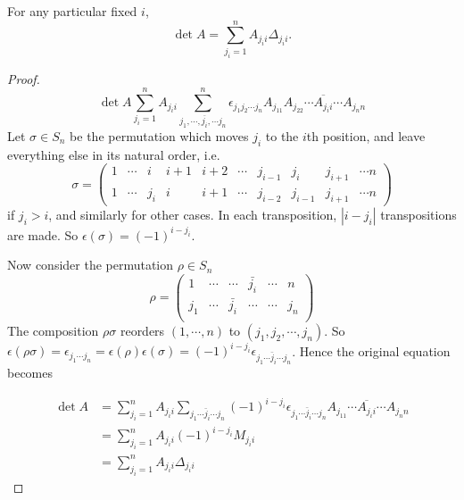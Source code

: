 \documentclass[a4paper]{article}
\begin{document}
\begin{thm}
  For any particular fixed $i$,
  \[
  \det A = \sum_{j_i = 1}^{n} A_{j_ii}\Delta_{j_ii}.
  \]
\end{thm}
\begin{proof}
  \[
  \det A\sum_{j_i = 1}^nA_{j_ii}\sum_{j_1, \cdots, \overline{j_i}, \cdots j_n}^n \epsilon_{j_1j_2\cdots j_n} A_{j_11}A_{j_22}\cdots \overline{A_{j_ii}}\cdots A_{j_nn}
  \]
  Let $\sigma \in S_n$ be the permutation which moves $j_i$ to the $i$th position, and leave everything else in its natural order, i.e.
  \[
  \sigma =
  \begin{pmatrix}
    1 &\cdots& i & i + 1 & i + 2 & \cdots &j_{i - 1}&j_i& j_{i + 1} & \cdots n\\
    1 & \cdots & j_i & i & i + 1 & \cdots & j_{i - 2} & j_{i - 1} & j_{i + 1} & \cdots n
  \end{pmatrix}
  \]
  if $j_i > i$, and similarly for other cases. In each transposition, $|i - j_i|$ transpositions are made. So $\epsilon(\sigma) = (-1)^{i - j_i}$.

  Now consider the permutation $\rho\in S_n$
  \[
  \rho =
  \begin{pmatrix}
    1 & \cdots & \cdots & \bar {j_i} & \cdots & n\\
    j_1 & \cdots & \bar{j_i} & \cdots & \cdots & j_n\\
  \end{pmatrix}
  \]
  The composition $\rho\sigma$ reorders $(1, \cdots, n)$  to $(j_1, j_2,\cdots, j_n)$. So $\epsilon(\rho\sigma) = \epsilon_{j_1\cdots j_n} = \epsilon(\rho)\epsilon(\sigma) = (-1)^{i - j_i} \epsilon_{j_1\cdots \bar j_i \cdots j_n}$. Hence the original equation becomes

\begin{align*}
  \det A &= \sum_{j_i = 1}^n A_{j_i i} \sum_{j_1\cdots \bar j_i\cdots j_n}(-1)^{i - j_i} \epsilon_{j_1\cdots \bar j_i \cdots j_n} A_{j_11}\cdots \overline{A_{j_ii}} \cdots A_{j_nn}\\
  &= \sum_{j_i = 1}^n A_{j_ii} (-1)^{i - j_i}M_{j_ii}\\
  &= \sum_{j_i = 1}^{n} A_{j_ii}\Delta_{j_ii}
\end{align*}
\end{proof}
\end{document}
